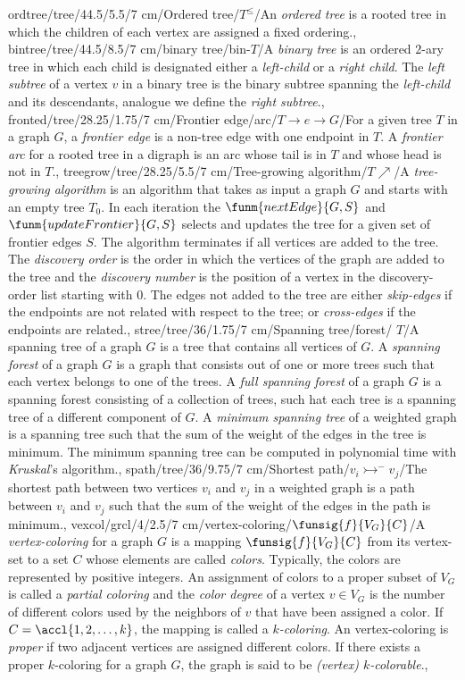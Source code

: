 ordtree/tree/44.5/5.5/7 cm/{Ordered tree}/{$T^{\leq}$}/{An \emph{ordered tree} is a rooted tree in which the children of each vertex are assigned a fixed ordering.},%
bintree/tree/44.5/8.5/7 cm/{binary tree}/{bin-$T$}/{A \emph{binary tree} is an ordered $2$-ary tree in which each child is designated either a \emph{left-child} or a \emph{right child}. The \emph{left subtree} of a vertex $v$ in a binary tree is the binary
 subtree spanning the \emph{left-child} and its descendants, analogue we define the \emph{right subtree}.},%
fronted/tree/28.25/1.75/7 cm/{Frontier edge/arc}/{$T\rightarrow e\rightarrow G$}/{For a given tree $T$ in a graph $G$, a \emph{frontier edge} is a non-tree edge with one endpoint in $T$. A \emph{frontier arc} for a rooted tree in a digraph is an arc whose tail is in $T$ and whose head is not in $T$.},
treegrow/tree/28.25/5.5/7 cm/{Tree-growing algorithm}/{$T\nearrow$}/{A \emph{tree-growing algorithm} is an algorithm that takes as input a graph $G$ and starts with an empty tree $T_0$. In each iteration the $\funm{nextEdge}{G,S}$ and $\funm{updateFrontier}{G,S}$ selects and updates the tree for a given set of frontier edges $S$. The algorithm terminates if all vertices are added to the tree. The \emph{discovery order} is the order in which the vertices of the graph are added to the tree and the \emph{discovery number} is the position of a vertex in the discovery-order list starting with $0$. The edges not added to the tree are either \emph{skip-edges} if the endpoints are not related with respect to the tree; or \emph{cross-edges} if the endpoints are related.},
stree/tree/36/1.75/7 cm/{Spanning tree/forest}/{\spanning{} $T$}/{A spanning tree of a graph $G$ is a tree that contains all vertices of $G$. A \emph{spanning forest} of a graph $G$ is a graph that consists out of one or more trees such that each vertex belongs to one of the trees. A \emph{full spanning forest} of a graph $G$ is a spanning forest consisting of a collection of trees, such hat each tree is a spanning tree of a different component of $G$. A \emph{minimum spanning tree} of a weighted graph is a spanning tree such that the sum of the weight of the edges in the tree is minimum. The minimum spanning tree can be computed in polynomial time with \emph{Kruskal}'s algorithm.},%
spath/tree/36/9.75/7 cm/{Shortest path}/{$v_i\rightarrowtail^{-} v_j$}/{The shortest path between two vertices $v_i$ and $v_j$ in a weighted graph is a path between $v_i$ and $v_j$ such that the sum of the weight of the edges in the path is minimum.},%
vexcol/grcl/4/2.5/7 cm/{vertex-coloring}/{$\funsig{f}{V_G}{C}$}/{A \emph{vertex-coloring} for a graph $G$ is a mapping $\funsig{f}{V_G}{C}$ from its vertex-set to a set $C$ whose elements are called \emph{colors}. Typically, the colors are represented by positive integers. An assignment of colors to a proper subset of $V_G$ is called a \emph{partial coloring} and the \emph{color degree} of a vertex $v\in V_G$ is the number of different colors used by the neighbors of $v$ that have been assigned a color. If $C=\accl{1,2,\ldots,k}$, the mapping is called a \emph{$k$-coloring}. An vertex-coloring is \emph{proper} if two adjacent vertices are assigned different colors. If there exists a proper $k$-coloring for a graph $G$, the graph is said to be \emph{(vertex) $k$-colorable}.},
